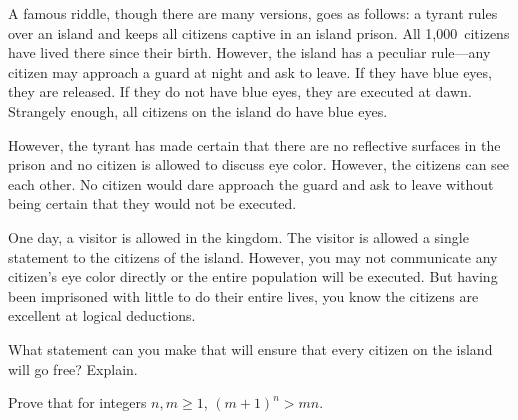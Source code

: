 \documentclass[11pt,letterpaper]{article}
\begin{document}
\newpage





 A famous riddle, though there are many versions, goes as follows: a tyrant rules over an island and keeps all citizens captive in an island prison. All 1,000~citizens have lived there since their birth. However, the island has a peculiar rule---any citizen may approach a guard at night and ask to leave. If they have blue eyes, they are released. If they do not have blue eyes, they are executed at dawn. Strangely enough, all citizens on the island do have blue eyes. 

However, the tyrant has made certain that there are no reflective surfaces in the prison and no citizen is allowed to discuss eye color. However, the citizens can see each other. No citizen would dare approach the guard and ask to leave without being certain that they would not be executed. 

One day, a visitor is allowed in the kingdom. The visitor is allowed a single statement to the citizens of the island. However, you may not communicate any citizen's eye color directly or the entire population will be executed. But having been imprisoned with little to do their entire lives, you know the citizens are excellent at logical deductions. 

What statement can you make that will ensure that every citizen on the island will go free? Explain. 





\newpage





 Prove that for integers $n, m \geq 1$, $(m + 1)^n > mn$. 
\end{document}

